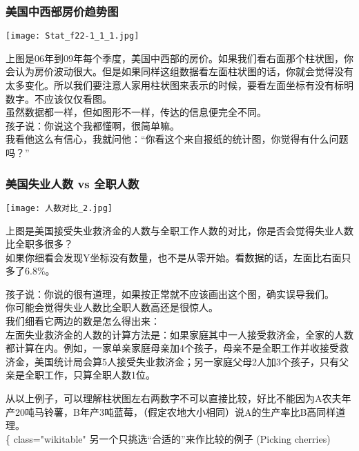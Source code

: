 \hypertarget{ux7f8eux56fdux4e2dux897fux90e8ux623fux4ef7ux8d8bux52bfux56fe}{%
\subsubsection{美国中西部房价趋势图}\label{ux7f8eux56fdux4e2dux897fux90e8ux623fux4ef7ux8d8bux52bfux56fe}}


\texttt{[image: Stat\_f22-1\_1\_1.jpg]}

上图是06年到09年每个季度，美国中西部的房价。如果我们看右面那个柱状图，你会认为房价波动很大。但是如果同样这组数据看左面柱状图的话，你就会觉得没有太多变化。所以我们要注意人家用柱状图来表示的时候，要看左面坐标有没有标明数字。不应该仅仅看图。\\
虽然数据都一样，但如图形不一样，传达的信息便完全不同。\\
孩子说：你说这个我都懂啊，很简单嘛。\\
我看他这么有信心，我就问他：``你看这个来自报纸的统计图，你觉得有什么问题吗？''\\

\hypertarget{ux7f8eux56fdux5931ux4e1aux4ebaux6570-vs-ux5168ux804cux4ebaux6570}{%
\subsubsection{美国失业人数 vs
全职人数}\label{ux7f8eux56fdux5931ux4e1aux4ebaux6570-vs-ux5168ux804cux4ebaux6570}}


\texttt{[image: 人数对比\_2.jpg]}

上图是美国接受失业救济金的人数与全职工作人数的对比，你是否会觉得失业人数比全职多很多？\\
如果你细看会发现Y坐标没有数量，也不是从零开始。看数据的话，左面比右面只多了6.8\%。

孩子说：你说的很有道理，如果按正常就不应该画出这个图，确实误导我们。\\
你可能会觉得失业人数比全职人数高还是很惊人。\\
我们细看它两边的数是怎么得出来：\\
左面失业救济金的人数的计算方法是：如果家庭其中一人接受救济金，全家的人数都计算在内。例如，一家单亲家庭母亲加4个孩子，母亲不是全职工作并收接受救济金，美国统计局会算5人接受失业救济金；另一家庭父母2人加3个孩子，只有父亲是全职工作，只算全职人数1位。

从以上例子，可以理解柱状图左右两数字不可以直接比较，好比不能因为A农夫年产20吨马铃薯，B年产3吨蓝莓，（假定农地大小相同）说A的生产率比B高同样道理。\\
\{\textbar{} class="wikitable" \textbar{}
另一个只挑选``合适的''来作比较的例子 (Picking cherries)\\

